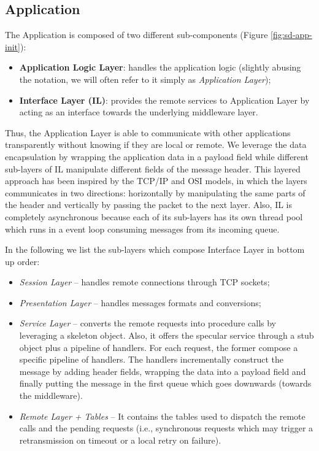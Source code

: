 \subsection{Application}
The Application is composed of two different sub-components (Figure
\ref{fig:sd-app-init}):

\begin{itemize}
  \item \textbf{Application Logic Layer}: handles the application logic
    (slightly abusing the notation, we will often refer to it simply as
    \textit{Application Layer});
  \item \textbf{Interface Layer (IL)}: provides the remote services to Application
    Layer by acting as an interface towards the underlying middleware layer.
\end{itemize}

Thus, the Application Layer is able to communicate with other applications
transparently without knowing if they are local or remote. We leverage the data
encapsulation by wrapping the application data in a payload field while
different sub-layers of IL manipulate different fields of the
message header.  This layered
approach has been inspired by the TCP/IP and OSI models, in which the layers
communicates in two directions: horizontally by manipulating the same parts
of the header and vertically by passing the packet to the next layer.
Also, IL is completely asynchronous because each of its sub-layers has its own
thread pool which runs in a event loop consuming messages from its incoming
queue.

In the following we list the sub-layers which compose Interface Layer in
bottom up order:

\begin{itemize}
  \item \textit{Session Layer} --
  handles remote connections through TCP sockets;
  \item \textit{Presentation Layer} --
  handles messages formats and conversions;
  \item \textit{Service Layer} --
  converts the remote requests into procedure calls
  by leveraging a skeleton object.
  Also, it offers the specular service through a stub object plus a pipeline
  of handlers. For each request, the former compose a specific pipeline
  of handlers. The handlers incrementally construct the message by adding
  header fields, wrapping the data into a payload field and finally putting
  the message in the first queue which goes downwards (towards the middleware).
  \item \textit{Remote Layer + Tables} --
  It contains the tables used
  to dispatch the remote calls and the pending requests (i.e., synchronous
  requests which may trigger a retransmission on timeout or a local retry on
  failure).
\end{itemize}




